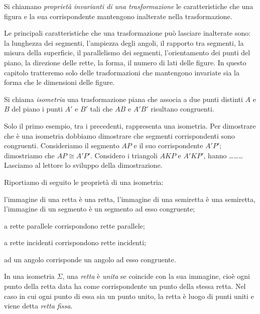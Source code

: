 \begin{definizione}
Si chiamano \emph{proprietà invarianti di una trasformazione} le 
caratteristiche che una figura e la sua corrispondente mantengono 
inalterate nella trasformazione.
\end{definizione}

Le principali caratteristiche che una trasformazione può lasciare 
inalterate sono: la lunghezza dei segmenti, l'ampiezza degli angoli, 
il rapporto tra segmenti, la misura della superficie, il parallelismo 
dei segmenti, l'orientamento dei punti del piano, la direzione delle 
rette, la forma, il numero di lati delle figure.
In questo capitolo tratteremo solo delle trasformazioni che 
mantengono invariate sia la forma che le dimensioni delle figure.

\begin{definizione}
Si chiama \emph{isometria} una trasformazione piana che associa a due 
punti distinti $A$ e $B$ del piano i punti $A'$ e $B'$ tali che $AB$ 
e $A'B'$ risultano congruenti.
\end{definizione}

Solo il primo esempio, tra i precedenti, rappresenta una isometria. 
Per dimostrare che è una isometria dobbiamo dimostrare che segmenti 
corrispondenti sono congruenti. Consideriamo il segmento $AP$ e il 
suo corrispondente $A'P'$; dimostriamo che $AP\cong A'P'$. Considero 
i triangoli $AKP$ e $A'KP'$, hanno \ldots\ldots\ldots{}
Lasciamo al lettore lo sviluppo della dimostrazione.

Riportiamo di seguito le proprietà di una isometria:
\begin{itemize*}
\item l'immagine di una retta è una retta, l'immagine di una 
semiretta è una semiretta, l'immagine di un segmento è un segmento ad 
esso congruente;
\item a rette parallele corrispondono rette parallele;
\item a rette incidenti corrispondono rette incidenti;
\item ad un angolo corrisponde un angolo ad esso congruente.
\end{itemize*}

\begin{definizione}
In una isometria $\Sigma$, una \emph{retta} è \emph{unita} se 
coincide con la sua immagine, cioè ogni punto della retta data ha 
come corrispondente un punto della stessa retta.
Nel caso in cui ogni punto di essa sia un punto unito, la retta è 
luogo di punti uniti e viene detta \emph{retta fissa}.
\end{definizione}

